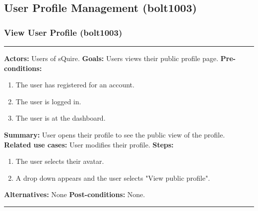 \documentclass[11pt]{report}
\begin{document}
\subsection{User Profile Management (bolt1003)}
\subsubsection{View User Profile (bolt1003)}
\vspace{2pt}
\hrule
\vspace{8pt}
 \textbf{Actors:} Users of sQuire. \newline
\textbf{Goals:} Users views their public profile page. \newline
 \textbf{Pre-conditions:} \begin{enumerate}
  \item The user has registered for an account.
  \item The user is logged in.
  \item The user is at the dashboard.
 \end{enumerate}
 \textbf{Summary:} User opens their profile to see the public view of the profile.\newline
\textbf{Related use cases:} User modifies their profile. \newline
\textbf{Steps:} \begin{enumerate}
  \item The user selects their avatar.
  \item A drop down appears and the user selects "View public profile".
 \end{enumerate}
 \textbf{Alternatives:} None \newline
 \textbf{Post-conditions:} None. \newline
\vspace{8pt}
\hrule
\newpage
\end{document}
